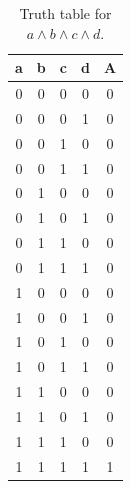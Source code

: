 \begin{table}[!tb]
    \centering
    \begin{tabular}{|c|c|c|c|c|}
        \hline
        \textbf{a} & \textbf{b} & \textbf{c} & \textbf{d} & \textbf{A} \\ \hline
        0 & 0 & 0 & 0 & 0 \\ \hline
        0 & 0 & 0 & 1 & 0 \\ \hline
        0 & 0 & 1 & 0 & 0 \\ \hline
        0 & 0 & 1 & 1 & 0 \\ \hline
        0 & 1 & 0 & 0 & 0 \\ \hline
        0 & 1 & 0 & 1 & 0 \\ \hline
        0 & 1 & 1 & 0 & 0 \\ \hline
        0 & 1 & 1 & 1 & 0 \\ \hline
        1 & 0 & 0 & 0 & 0 \\ \hline
        1 & 0 & 0 & 1 & 0 \\ \hline
        1 & 0 & 1 & 0 & 0 \\ \hline
        1 & 0 & 1 & 1 & 0 \\ \hline
        1 & 1 & 0 & 0 & 0 \\ \hline
        1 & 1 & 0 & 1 & 0 \\ \hline
        1 & 1 & 1 & 0 & 0 \\ \hline
        1 & 1 & 1 & 1 & 1 \\ \hline
    \end{tabular}
    \caption{Truth table for $a \land b \land c \land d$.}
    \label{tab:truthtab}
\end{table}

